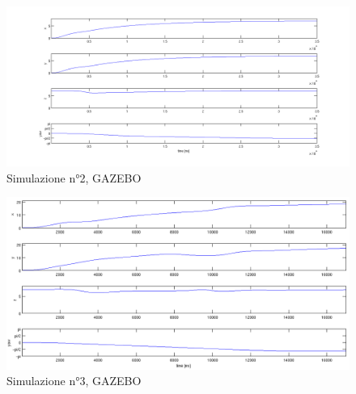 \documentclass[a4paper,10pt]{article}
\begin{document}
\begin{figure}[p]
\hspace*{-3.5cm}
\includegraphics[scale=0.5]{img/plot/gazebo/simulazione2_pdf.png}
\caption{Simulazione n°2, GAZEBO}
\label{sim:2G}
\end{figure}

\begin{figure}[p]
\hspace*{-3.5cm}
\includegraphics[scale=0.5]{img/plot/gazebo/simulazione3_pdf.png}
\caption{Simulazione n°3, GAZEBO}
\label{sim:3G}
\end{figure}

\FloatBarrier
\newpage



\end{document}
